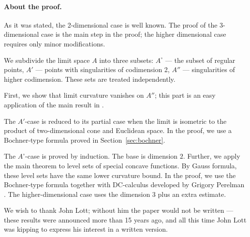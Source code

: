 \paragraph{About the proof.}
As it was stated, the 2-dimensional case is well known.
The proof of the 3-dimensional case is the main step in the proof;
the higher dimensional case requires only minor modifications.

We subdivide the limit space $A$ into
three subsets: $A^\circ$ --- the subset of regular 
points, $A'$ --- points with singularities of codimension 2,
$A''$ --- singularities of higher codimension.
These sets are treated independently.

First, we show that limit curvature vanishes on $A''$; 
this part is an easy application of the main result in \cite{petrunin-SC}.

The $A'$-case is reduced to its partial case when the limit is isometric to the product of two-dimensional cone and Euclidean space.
In the proof, we use a Bochner-type formula proved in Section~\ref{sec:bochner}.

The $A^\circ$-case is proved by induction.
The base is dimension $2$.
Further, we apply the main theorem to level sets of special concave functions.
By Gauss formula, these level sets have the same lower curvature bound. 
In the proof, we use the Bochner-type formula together with DC-calculus developed by Grigory Perelman \cite{PerDC}.
The higher-dimensional case uses the dimension 3 plus an extra estimate.

We wish to thank John Lott; without him the paper would not be written ---
these results were announced more than 15 years ago, and all this time John Lott was kipping to express his interest in a written version.
